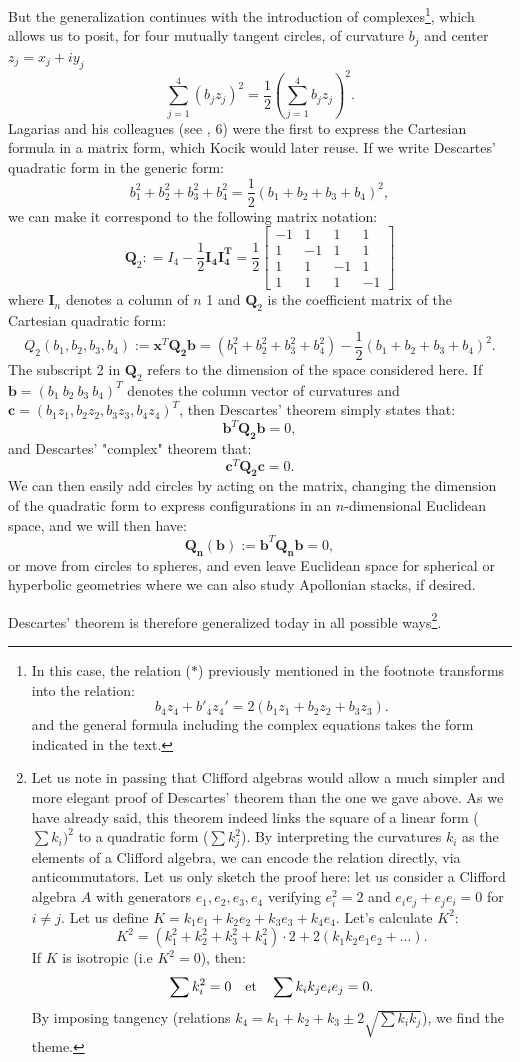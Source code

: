 \documentclass[12pt]{article}
\theoremstyle{définition}
\theoremstyle{remark}
\theoremstyle{plain}
\theoremstyle{plain}
\begin{document}
But the generalization continues with the introduction of complexes\footnote{In this case, the relation ($\ast$) previously mentioned in the footnote transforms into the relation:
\[
b_4z_4 + b'_4z_4' = 2(b_1z_1 + b_2z_2 + b_3z_3).
\]
and the general formula including the complex equations takes the form indicated in the text.}, which allows us to posit, for four mutually tangent circles, of curvature $b_j$ and center $z_j = x_j + iy_j$
\[
\sum_{j=1}^{4} (b_jz_j)^2= \frac{1}{2}(\sum_{j=1}^{4} b_jz_j)^2. \]
Lagarias and his colleagues (see \cite{Lag}, 6) were the first to express the Cartesian formula in a matrix form, which Kocik would later reuse. If we write Descartes' quadratic form in the generic form:
\[
b_1^2+b_2^2+b_3^2+b_4^2 = \frac{1}{2}(b_1+b_2+b_3+b_4)^2,
\]
we can make it correspond to the following matrix notation:
\[
\mathbf{Q}_2 : = I_4 - \frac{1}{2} \mathbf{I_4I_4^T}= \frac{1}{2}
\begin{bmatrix}
-1 &  1 & 1 & 1 \\
1 & -1 & 1 & 1 \\
1 & 1 & -1 & 1 \\
1 & 1 & 1 & -1
\end{bmatrix}
\]
where $\mathbf{I}_n$ denotes a column of $n$ 1 and $\mathbf{Q}_2$ is the coefficient matrix of the Cartesian quadratic form:
\[
Q_2(b_1, b_2, b_3, b_4):= \mathbf{x}^T \mathbf{Q_2 b} = (b_1^2+ b_2^2 + b_3^2+ b_4^2) - \frac{1}{2} (b_1+ b_2 + b_3+ b_4)^2.
\]
The subscript 2 in $\mathbf{Q}_2$ refers to the dimension of the space considered here. If $\mathbf{b} = (b_1\ b_2\ b_3\ b_4)^T$ denotes the column vector of curvatures and $\mathbf{c} = (b_1z_1, b_2z_2, b_3z_3, b_4z_4)^T$, then Descartes' theorem simply states that:
\[
\mathbf{b}^T\mathbf{Q_2b} = 0,
\]
and Descartes' "complex" theorem that:
\[
\mathbf{c}^T\mathbf{Q_2c} = 0.
\]
We can then easily add circles by acting on the matrix, changing the dimension of the quadratic form to express configurations in an $n$-dimensional Euclidean space, and we will then have:
\[
\mathbf{Q_n(b) := b}^T \mathbf{Q_nb} = 0,
\]
or move from circles to spheres, and even leave Euclidean space for spherical or hyperbolic geometries where we can also study Apollonian stacks, if desired.

Descartes' theorem is therefore generalized today in all possible ways\footnote{Let us note in passing that Clifford algebras would allow a much simpler and more elegant proof of Descartes' theorem than the one we gave above. As we have already said, this theorem indeed links the square of a linear form ($\sum k_i)^2$ to a quadratic form ($\sum k_j^2$). By interpreting the curvatures $k_i$ as the elements of a Clifford algebra, we can encode the relation directly, via anticommutators. Let us only sketch the proof here: let us consider a Clifford algebra $A$ with generators $e_1, e_2, e_3, e_4$ verifying $e_i^2 = 2$ and $e_ie_j +e_je_i = 0$ for $i \neq j$. Let us define $K = k_1e_1+k_2e_2 +k_3e_3+k_4e_4$. Let's calculate $K^2$:
\[
K^2 = (k_1^2 +k_2^2 + k_3^2 + k_4^2) \cdot 2 + 2(k_1k_2e_1e_2 + ...).
\]
If $K$ is isotropic (i.e $K^2 = 0$), then:
\[
\sum k_i^2 = 0 \quad \textnormal{et} \quad \sum k_ik_je_ie_j = 0.
\]
By imposing tangency (relations $k_4 = k_1+k_2+k_3 \pm 2 \sqrt{\sum k_ik_j}$), we find the theme.}.
\end{document}
